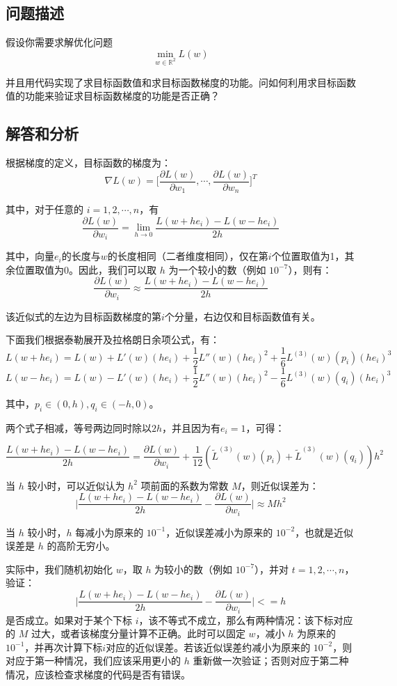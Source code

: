 \documentclass[12pt]{article}
\begin{document}
\subsection{问题描述}
假设你需要求解优化问题
$$
\min_{w\in\mathbb{R}^2}L(w)
$$

并且用代码实现了求目标函数值和求目标函数梯度的功能。问如何利用求目标函数值的功能来验证求目标函数梯度的功能是否正确？

\subsection{解答和分析}
根据梯度的定义，目标函数的梯度为：
$$
\nabla L(w) = \big[\frac{\partial L(w)}{\partial w_1}, \cdots, \frac{\partial L(w)}{\partial w_n}\big]^T
$$

其中，对于任意的 $i = 1, 2, \cdots, n$，有
$$
\frac{\partial L(w)}{\partial w_i} = \lim_{h\rightarrow 0}\frac{L(w+he_i) - L(w-he_i)}{2h}
$$

其中，向量$e_i$的长度与$w$的长度相同（二者维度相同），仅在第$i$个位置取值为1，其余位置取值为0。因此，我们可以取 $h$ 为一个较小的数（例如 $10^{-7}$），则有：
$$
\frac{\partial L(w)}{\partial w_i} \approx \frac{L(w+he_i) - L(w-he_i)}{2h}
$$

该近似式的左边为目标函数梯度的第$i$个分量，右边仅和目标函数值有关。

下面我们根据泰勒展开及拉格朗日余项公式，有：
$$
L(w+he_i) = L(w) + L'(w)(he_i) + \frac{1}{2} L''(w)(he_i)^2 + \frac{1}{6}L^{(3)}(w)(p_i)(he_i)^3
$$
$$
L(w-he_i) = L(w) - L'(w)(he_i) + \frac{1}{2} L''(w)(he_i)^2 - \frac{1}{6}L^{(3)}(w)(q_i)(he_i)^3
$$

其中，$p_i \in (0,h), q_i \in (-h,0)$。

两个式子相减，等号两边同时除以$2h$，并且因为有$e_i=1$，可得：

$$
\frac{L(w+he_i) - L(w-he_i)}{2h} = \frac{\partial L(w)}{\partial w_i} + \frac{1}{12}(\tilde L^{(3)}(w)(p_i) + \tilde L^{(3)}(w)(q_i))h^2
$$

当 $h$ 较小时，可以近似认为 $h^2$ 项前面的系数为常数 $M$，则近似误差为：
$$
\big|\frac{L(w+he_i) - L(w-he_i)}{2h} - \frac{\partial L(w)}{\partial w_i}\big| \approx Mh^2
$$

当 $h$ 较小时，$h$ 每减小为原来的 $10^{-1}$，近似误差减小为原来的 $10^{-2}$，也就是近似误差是 $h$ 的高阶无穷小。

实际中，我们随机初始化 $w$，取 $h$ 为较小的数（例如 $10^{-7}$），并对 $t = 1, 2, \cdots, n$，验证：
$$
\big|\frac{L(w+he_i) - L(w-he_i)}{2h} - \frac{\partial L(w)}{\partial w_i}\big| <= h
$$
是否成立。如果对于某个下标 $i$，该不等式不成立，那么有两种情况：该下标对应的 $M$ 过大，或者该梯度分量计算不正确。此时可以固定 $w$，减小 $h$ 为原来的 $10^{-1}$，并再次计算下标$i$对应的近似误差。若该近似误差约减小为原来的 $10^{-2}$，则对应于第一种情况，我们应该采用更小的 $h$ 重新做一次验证；否则对应于第二种情况，应该检查求梯度的代码是否有错误。
\end{document}
